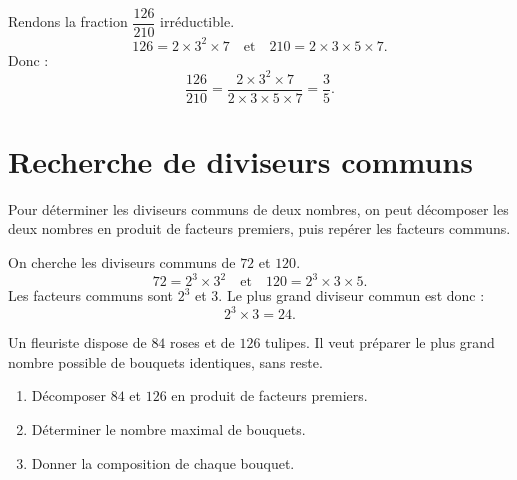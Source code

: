 \documentclass[a4paper,10pt]{report}
\begin{document}
\begin{ex}
Rendons la fraction $\dfrac{126}{210}$ irréductible.
\[
126=2\times 3^2\times 7
\quad \text{et} \quad
210=2\times 3\times 5\times 7.
\]
Donc :
\[
\dfrac{126}{210}
=\dfrac{2\times 3^2\times 7}{2\times 3\times 5\times 7}
=\dfrac{3}{5}.
\]
\end{ex}

\section{Recherche de diviseurs communs}

\begin{meth}
Pour déterminer les diviseurs communs de deux nombres, on peut décomposer les deux nombres en produit de facteurs premiers, puis repérer les facteurs communs.
\end{meth}

\begin{ex}
On cherche les diviseurs communs de $72$ et $120$.
\[
72=2^3\times 3^2
\quad \text{et} \quad
120=2^3\times 3\times 5.
\]
Les facteurs communs sont $2^3$ et $3$.
Le plus grand diviseur commun est donc :
\[
2^3\times 3=24.
\]
\end{ex}

\begin{ex}
Un fleuriste dispose de $84$ roses et de $126$ tulipes.
Il veut préparer le plus grand nombre possible de bouquets identiques, sans reste.

\begin{enumerate}
\item Décomposer $84$ et $126$ en produit de facteurs premiers.
\item Déterminer le nombre maximal de bouquets.
\item Donner la composition de chaque bouquet.
\end{enumerate}

\noindent\grandscarreaux{\linewidth}{5cm}
\end{ex}
\end{document}
